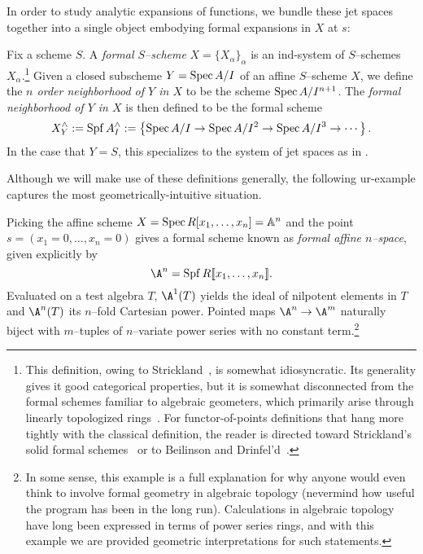 In order to study analytic expansions of functions, we bundle these jet spaces together into a single object embodying formal expansions in \(X\) at \(s\):
\begin{definition}\label{DefnCompletion}
Fix a scheme \(S\).  A \textit{formal \(S\)--scheme} \(X = \{X_\alpha\}_\alpha\) is an ind-system of \(S\)--schemes \(X_\alpha\).\footnote{This definition, owing to Strickland~\cite[Definition 4.1]{StricklandFSFG}, is somewhat idiosyncratic.  Its generality gives it good categorical properties, but it is somewhat disconnected from the formal schemes familiar to algebraic geometers, which primarily arise through linearly topologized rings~\cite[pg.\ 194]{Hartshorne}.  For functor-of-points definitions that hang more tightly with the classical definition, the reader is directed toward Strickland's solid formal schemes~\cite[Definition 4.16]{StricklandFSFG} or to Beilinson and Drinfel'd~\cite[Section 7.11.1]{BeilinsonDrinfeld}.}  Given a closed subscheme \(Y = \operatorname{Spec} A/I\) of an affine \(S\)--scheme \(X\), we define the \textit{\(n\){\th} order neighborhood of \(Y\) in \(X\)} to be the scheme \(\operatorname{Spec} A/I^{n+1}\).  The \textit{formal neighborhood of \(Y\) in \(X\)} is then defined to be the formal scheme \[X^\wedge_Y := \operatorname{Spf} A^\wedge_I := \left\{ \operatorname{Spec} A/I \to \operatorname{Spec} A/I^2 \to \operatorname{Spec} A/I^3 \to \cdots \right\}.\]  In the case that \(Y = S\), this specializes to the system of jet spaces as in .
\end{definition}

Although we will make use of these definitions generally, the following ur-example captures the most geometrically-intuitive situation.

\begin{example}\label{MapsOfFVarsArePowerSeries}
Picking the affine scheme \(X = \operatorname{Spec} R[x_1, \ldots, x_n] = \mathbb A^n\) and the point \(s = (x_1 = 0, \ldots, x_n = 0)\) gives a formal scheme known as \textit{formal affine \(n\)--space}, given explicitly by \[\A^n = \Spf R\llbracket x_1, \ldots, x_n\rrbracket.\]  Evaluated on a test algebra \(T\), \(\A^1(T)\) yields the ideal of nilpotent elements in \(T\) and \(\A^n(T)\) its \(n\)--fold Cartesian power.  Pointed maps \(\A^n \to \A^m\) naturally biject with \(m\)--tuples of \(n\)--variate power series with no constant term.\footnote{In some sense, this example is a full explanation for why anyone would even think to involve formal geometry in algebraic topology (nevermind how useful the program has been in the long run).  Calculations in algebraic topology have long been expressed in terms of power series rings, and with this example we are provided geometric interpretations for such statements.}
\end{example}

